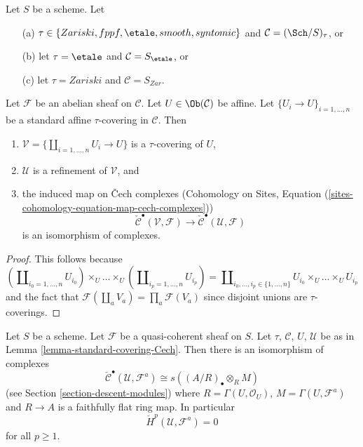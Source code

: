 \begin{lemma}
\label{lemma-standard-covering-Cech}
Let $S$ be a scheme. Let
\begin{enumerate}
\item[(a)] $\tau \in \{Zariski, \linebreak[0] fppf, \linebreak[0]
\etale, \linebreak[0] smooth, \linebreak[0] syntomic\}$
and $\mathcal{C} = (\Sch/S)_\tau$, or
\item[(b)] let $\tau = \etale$ and $\mathcal{C} = S_\etale$, or
\item[(c)] let $\tau = Zariski$ and $\mathcal{C} = S_{Zar}$.
\end{enumerate}
Let $\mathcal{F}$ be an abelian sheaf on $\mathcal{C}$.
Let $U \in \Ob(\mathcal{C})$ be affine.
Let $\{U_i \to U\}_{i = 1, \ldots, n}$ be a standard affine
$\tau$-covering in $\mathcal{C}$. Then
\begin{enumerate}
\item $\mathcal{V} = \{\coprod_{i = 1, \ldots, n} U_i \to U\}$ is a
$\tau$-covering of $U$,
\item $\mathcal{U}$ is a refinement of $\mathcal{V}$, and
\item the induced map on {\v C}ech complexes
(Cohomology on Sites,
Equation (\ref{sites-cohomology-equation-map-cech-complexes}))
$$
\check{\mathcal{C}}^\bullet(\mathcal{V}, \mathcal{F})
\longrightarrow
\check{\mathcal{C}}^\bullet(\mathcal{U}, \mathcal{F})
$$
is an isomorphism of complexes.
\end{enumerate}
\end{lemma}

\begin{proof}
This follows because
$$
(\coprod\nolimits_{i_0 = 1, \ldots, n} U_{i_0}) \times_U
\ldots \times_U
(\coprod\nolimits_{i_p = 1, \ldots, n} U_{i_p})
=
\coprod\nolimits_{i_0, \ldots, i_p \in \{1, \ldots, n\}}
U_{i_0} \times_U \ldots \times_U U_{i_p}
$$
and the fact that $\mathcal{F}(\coprod_a V_a) = \prod_a \mathcal{F}(V_a)$
since disjoint unions are $\tau$-coverings.
\end{proof}

\begin{lemma}
\label{lemma-standard-covering-Cech-quasi-coherent}
Let $S$ be a scheme. Let $\mathcal{F}$ be a quasi-coherent sheaf on $S$.
Let $\tau$, $\mathcal{C}$, $U$, $\mathcal{U}$ be as in
Lemma \ref{lemma-standard-covering-Cech}. Then there is an isomorphism
of complexes
$$
\check{\mathcal{C}}^\bullet(\mathcal{U}, \mathcal{F}^a)
\cong
s((A/R)_\bullet \otimes_R M)
$$
(see Section \ref{section-descent-modules})
where $R = \Gamma(U, \mathcal{O}_U)$, $M = \Gamma(U, \mathcal{F}^a)$
and $R \to A$ is a faithfully flat ring map. In particular
$$
\check{H}^p(\mathcal{U}, \mathcal{F}^a) = 0
$$
for all $p \geq 1$.
\end{lemma}

